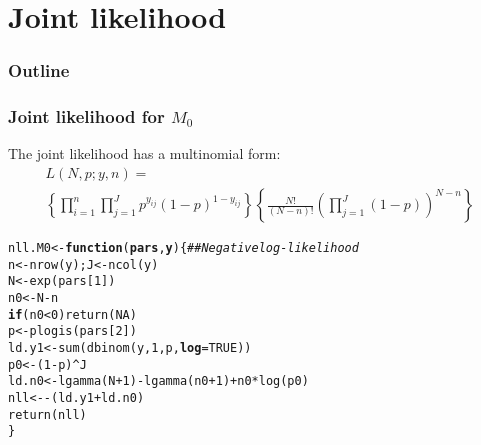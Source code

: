\documentclass[color=usenames,dvipsnames]{beamer}\usepackage[]{graphicx}\usepackage[]{color}
\makeatletter
\newcommand{\hlnum}[1]{\textcolor[rgb]{0.69,0.494,0}{#1}}%
\newcommand{\hlcom}[1]{\textcolor[rgb]{0.514,0.506,0.514}{\textit{#1}}}%
\newcommand{\hlopt}[1]{\textcolor[rgb]{0,0,0}{#1}}%
\newcommand{\hlstd}[1]{\textcolor[rgb]{0,0,0}{#1}}%
\newcommand{\hlkwa}[1]{\textcolor[rgb]{0,0,0}{\textbf{#1}}}%
\newcommand{\hlkwb}[1]{\textcolor[rgb]{0,0.341,0.682}{#1}}%
\newcommand{\hlkwc}[1]{\textcolor[rgb]{0,0,0}{\textbf{#1}}}%
\newcommand{\hlkwd}[1]{\textcolor[rgb]{0.004,0.004,0.506}{#1}}%
\newenvironment{kframe}{%
 \def\at@end@of@kframe{}%
 \ifinner\ifhmode%
  \def\at@end@of@kframe{\end{minipage}}%
  \begin{minipage}{\columnwidth}%
 \fi\fi%
 \def\FrameCommand##1{\hskip\@totalleftmargin \hskip-\fboxsep
 \colorbox{shadecolor}{##1}\hskip-\fboxsep
     \hskip-\linewidth \hskip-\@totalleftmargin \hskip\columnwidth}%
 \MakeFramed {\advance\hsize-\width
   \@totalleftmargin\z@ \linewidth\hsize
   \@setminipage}}%
 {\par\unskip\endMakeFramed%
 \at@end@of@kframe}
\newenvironment{knitrout}{}{} %
\makeatother
\begin{document}
\section{Joint likelihood}



\begin{frame}
  \frametitle{Outline}
  \Large
  \tableofcontents[currentsection]
\end{frame}


\begin{frame}[fragile]
  \frametitle{Joint likelihood for $M_0$}
  The joint likelihood has a multinomial form:
  \begin{multline*}
    L(N,p; y,n) = \\
    \left\{\prod_{i=1}^n \prod_{j=1}^J p^{y_{ij}}(1-p)^{1-y_{ij}}\right\}
    \left\{\frac{N!}{(N-n)!}  \left(\prod_{j=1}^J(1-p)\right)^{N-n} \right\}
  \end{multline*}
  \pause
  \vfill
\begin{knitrout}\scriptsize
{}\color{fgcolor}\begin{kframe}
\begin{alltt}
\hlstd{nll.M0} \hlkwb{<-} \hlkwa{function}\hlstd{(}\hlkwc{pars}\hlstd{,} \hlkwc{y}\hlstd{) \{}           \hlcom{## Negative log-likelihood}
    \hlstd{n} \hlkwb{<-} \hlkwd{nrow}\hlstd{(y);       J} \hlkwb{<-} \hlkwd{ncol}\hlstd{(y)}
    \hlstd{N} \hlkwb{<-} \hlkwd{exp}\hlstd{(pars[}\hlnum{1}\hlstd{])}
    \hlstd{n0} \hlkwb{<-} \hlstd{N}\hlopt{-}\hlstd{n}
    \hlkwa{if}\hlstd{(n0}\hlopt{<}\hlnum{0}\hlstd{)} \hlkwd{return}\hlstd{(}\hlnum{NA}\hlstd{)}
    \hlstd{p} \hlkwb{<-} \hlkwd{plogis}\hlstd{(pars[}\hlnum{2}\hlstd{])}
    \hlstd{ld.y1} \hlkwb{<-} \hlkwd{sum}\hlstd{(}\hlkwd{dbinom}\hlstd{(y,} \hlnum{1}\hlstd{, p,} \hlkwc{log}\hlstd{=}\hlnum{TRUE}\hlstd{))}
    \hlstd{p0} \hlkwb{<-} \hlstd{(}\hlnum{1}\hlopt{-}\hlstd{p)}\hlopt{^}\hlstd{J}
    \hlstd{ld.n0} \hlkwb{<-} \hlkwd{lgamma}\hlstd{(N}\hlopt{+}\hlnum{1}\hlstd{)}\hlopt{-}\hlkwd{lgamma}\hlstd{(n0}\hlopt{+}\hlnum{1}\hlstd{)}\hlopt{+}\hlstd{n0}\hlopt{*}\hlkwd{log}\hlstd{(p0)}
    \hlstd{nll} \hlkwb{<-} \hlopt{-}\hlstd{(ld.y1}\hlopt{+}\hlstd{ld.n0)}
    \hlkwd{return}\hlstd{(nll)}
\hlstd{\}}
\end{alltt}
\end{kframe}
\end{knitrout}
\end{frame}
\end{document}
